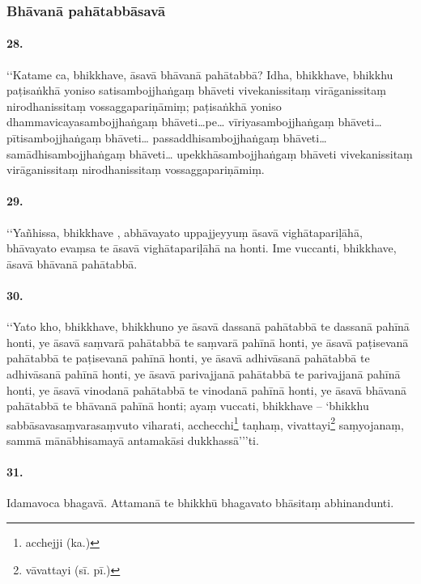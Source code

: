 \subsubsection{Bhāvanā pahātabbāsavā}

\paragraph{28.} ‘‘Katame ca, bhikkhave, āsavā bhāvanā pahātabbā? Idha, bhikkhave, bhikkhu paṭisaṅkhā yoniso satisambojjhaṅgaṃ bhāveti vivekanissitaṃ virāganissitaṃ nirodhanissitaṃ vossaggapariṇāmiṃ; paṭisaṅkhā yoniso dhammavicayasambojjhaṅgaṃ bhāveti…pe… vīriyasambojjhaṅgaṃ bhāveti… pītisambojjhaṅgaṃ bhāveti… passaddhisambojjhaṅgaṃ bhāveti… samādhisambojjhaṅgaṃ bhāveti… upekkhāsambojjhaṅgaṃ bhāveti vivekanissitaṃ virāganissitaṃ nirodhanissitaṃ vossaggapariṇāmiṃ.

\paragraph{29.} ‘‘Yañhissa, bhikkhave , abhāvayato uppajjeyyuṃ āsavā vighātapariḷāhā, bhāvayato evaṃsa te āsavā vighātapariḷāhā na honti. Ime vuccanti, bhikkhave, āsavā bhāvanā pahātabbā.

\paragraph{30.} ‘‘Yato kho, bhikkhave, bhikkhuno ye āsavā dassanā pahātabbā te dassanā pahīnā honti, ye āsavā saṃvarā pahātabbā te saṃvarā pahīnā honti, ye āsavā paṭisevanā pahātabbā te paṭisevanā pahīnā honti, ye āsavā adhivāsanā pahātabbā te adhivāsanā pahīnā honti, ye āsavā parivajjanā pahātabbā te parivajjanā pahīnā honti, ye āsavā vinodanā pahātabbā te vinodanā pahīnā honti, ye āsavā bhāvanā pahātabbā te bhāvanā pahīnā honti; ayaṃ vuccati, bhikkhave – ‘bhikkhu sabbāsavasaṃvarasaṃvuto viharati, acchecchi\footnote{acchejji (ka.)} taṇhaṃ, vivattayi\footnote{vāvattayi (sī. pī.)} saṃyojanaṃ, sammā mānābhisamayā antamakāsi dukkhassā’’’ti.

\paragraph{31.} Idamavoca bhagavā. Attamanā te bhikkhū bhagavato bhāsitaṃ abhinandunti.

